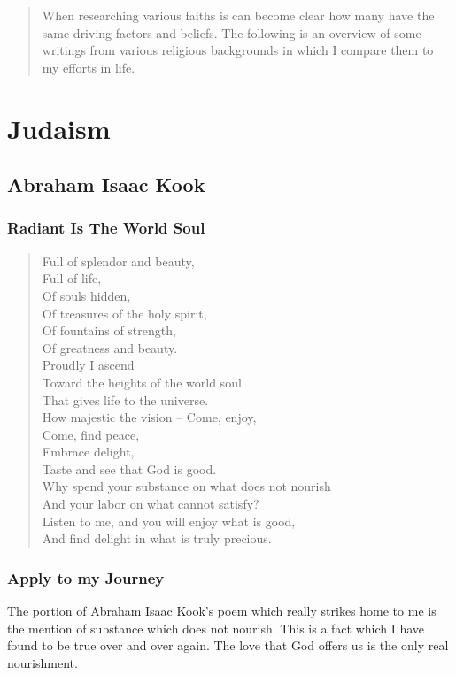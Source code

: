 \documentclass[11pt,a4paper]{scrartcl} %
\begin{document}
    \begin{abstract}
  When researching various faiths is can become clear how many have the same driving factors and beliefs. The following is an overview of some writings from various religious backgrounds in which I compare them to my efforts in life. 
    \end{abstract}
       
    \tableofcontents
    \section{Judaism}
    \subsection{Abraham Isaac Kook}  
    \subsubsection{Radiant Is The World Soul}
    \begin{verse}
Full of splendor and beauty,\\
Full of life,\\
Of souls hidden,\\
Of treasures of the holy spirit,\\
Of fountains of strength,\\
Of greatness and beauty.\\
Proudly I ascend\\
Toward the heights of the world soul\\
That gives life to the universe.\\
How majestic the vision – Come, enjoy,\\
Come, find peace,\\
Embrace delight,\\
Taste and see that God is good.\\
Why spend your substance on what does not nourish\\
And your labor on what cannot satisfy?\\
Listen to me, and you will enjoy what is good,\\
And find delight in what is truly precious.\\
\end{verse} 
\textcolor{brown}{\citealp[pg. 39]{eknath}}

\subsubsection{Apply to my Journey}
The portion of Abraham Isaac Kook's poem which really strikes home to me is the mention of substance which does not nourish. This is a fact which I have found to be true over and over again. The love that God offers us is the only real nourishment. 
\end{document}
